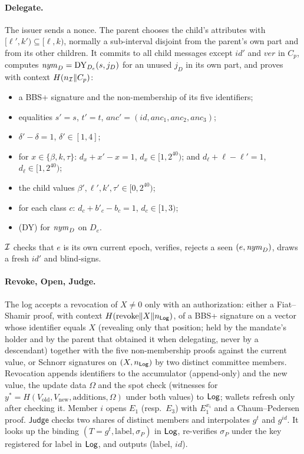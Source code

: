 \paragraph{Delegate.} The issuer sends a nonce. The parent chooses the child's attributes with $[\ell',k')\subseteq[\ell,k)$, normally a sub-interval disjoint from the parent's own part and from its other children. It commits to all child messages except $\mathit{id}'$ and $\mathit{ver}$ in $C_p$, computes $\mathit{nym}_D=\mathrm{DY}_{D_e}(s,j_D)$ for an unused $j_D$ in its own part, and proves with context $H(n_{\mathcal{I}}\|C_p)$:
\begin{itemize}[leftmargin=*]
\item a BBS+ signature and the non-membership of its five identifiers;
\item equalities $s'=s$, $t'=t$, $\mathit{anc}'=(\mathit{id},\mathit{anc}_1,\mathit{anc}_2,\mathit{anc}_3)$;
\item $\delta'-\delta=1$, $\delta'\in[1,4]$;
\item for $x\in\{\beta,k,\tau\}$: $d_x+x'-x=1$, $d_x\in[1,2^{40})$; and $d_\ell+\ell-\ell'=1$, $d_\ell\in[1,2^{40})$;
\item the child values $\beta',\ell',k',\tau'\in[0,2^{40})$;
\item for each class $c$: $d_c+b'_c-b_c=1$, $d_c\in[1,3)$;
\item (DY) for $\mathit{nym}_D$ on $D_e$.
\end{itemize}
$\mathcal{I}$ checks that $e$ is its own current epoch, verifies, rejects a seen $(e,\mathit{nym}_D)$, draws a fresh $\mathit{id}'$ and blind-signs.

\paragraph{Revoke, Open, Judge.} The log accepts a revocation of $X\neq0$ only with an authorization: either a Fiat--Shamir proof, with context $H(\text{revoke}\|X\|n_{\mathsf{Log}})$, of a BBS+ signature on a vector whose identifier equals $X$ (revealing only that position; held by the mandate's holder and by the parent that obtained it when delegating, never by a descendant) together with the five non-membership proofs against the current value, or Schnorr signatures on $(X,n_{\mathsf{Log}})$ by two distinct committee members. Revocation appends identifiers to the accumulator (append-only) and the new value, the update data $\Omega$ and the spot check (witnesses for $y^*=H(V_{\text{old}},V_{\text{new}},\text{additions},\Omega)$ under both values) to $\mathsf{Log}$; wallets refresh only after checking it. Member $i$ opens $E_1$ (resp.\ $E_3$) with $E_1^{x_i}$ and a Chaum--Pedersen proof. $\mathsf{Judge}$ checks two shares of distinct members and interpolates $g^{t}$ and $g^{\mathit{id}}$. It looks up the binding $(T=g^t,\text{label},\sigma_P)$ in $\mathsf{Log}$, re-verifies $\sigma_P$ under the key registered for label in $\mathsf{Log}$, and outputs (label, $\mathit{id}$).

